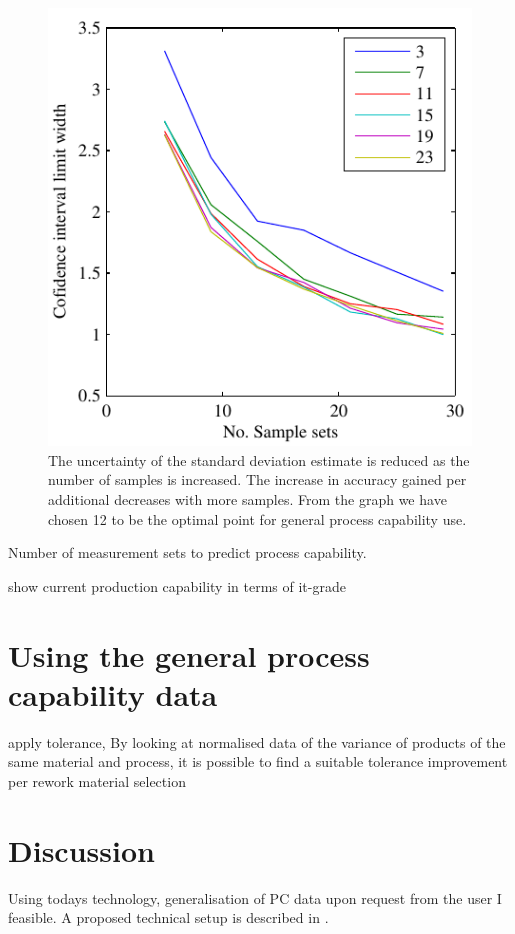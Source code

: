 \documentclass[aip,amsmath, reprint, author-year]{revtex4-1}
\begin{document}
\begin{figure}
\includegraphics{CLW90_lines.pdf}
\caption{\label{fig:cl_line}The uncertainty of the standard deviation estimate is reduced as the number of samples is increased. The increase in accuracy gained per additional decreases with more samples. From the graph we have chosen 12 to be the optimal point for general process capability use.}
\end{figure}

Number of measurement sets to predict process capability.  


show current production capability in terms of it-grade

\section{Using the general process capability data}
apply tolerance, By looking at normalised data of the variance of products of the same material and process, it is possible to find a suitable tolerance
improvement per rework
material selection


\section{Discussion}

Using todays technology, generalisation of PC data upon request from the user I feasible. A proposed technical setup is described in \cite{OkholmRask}.
\end{document}
